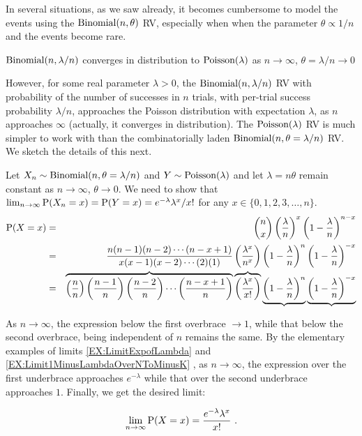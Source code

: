 \begin{example}\label{EgBinomialConvergesInDistToPoisson}
In several situations, as we saw already, it becomes cumbersome to model the events using the $\binomial(n,\theta)$ RV, especially when when the parameter $\theta \propto 1/n$ and the events become rare.  

\begin{center}
\begin{frame}
{$\binomial(n,\lambda/n)$ converges in distribution to $\poisson(\lambda)$ as $n \to \infty$, $\theta=\lambda/n \to 0$}
\end{frame}
\end{center}

However, for some real parameter $\lambda>0$, the $\binomial(n,\lambda/n)$ RV with probability of the number of successes in $n$ trials, with per-trial success probability $\lambda/n$, approaches the Poisson distribution with expectation $\lambda$, as $n$ approaches $\infty$ (actually, it converges in distribution).  
The $\poisson(\lambda)$ RV is much simpler to work with than the combinatorially laden $\binomial(n,\theta=\lambda/n)$ RV.  We sketch the details of this next.

Let $X_n \sim \binomial(n,\theta=\lambda/n)$ and $Y \sim \poisson(\lambda)$ and let $\lambda=n\theta$ remain constant as  $n \to \infty$, $\theta \to 0$.  
We need to show that $\lim_{n \to \infty} \P(X_n=x) = \P(Y=x) = e^{-\lambda}\lambda^x/x!$ for any $x \in \{0,1,2,3,\ldots,n\}$. 
\begin{eqnarray}
\P(X=x)
&=&
\binom{n}{x} \left( \frac{\lambda}{n} \right)^x \left( 1- \frac{\lambda}{n} \right)^{n-x} \notag \\
&=& \frac{n(n-1)(n-2)\cdots(n-x+1)}{x(x-1)(x-2)\cdots (2)(1)}
\left( \frac{\lambda^x}{n^x} \right)
\left( 1- \frac{\lambda}{n} \right)^n
\left( 1- \frac{\lambda}{n} \right)^{-x} \notag \\
&=&
\overbrace{\left( \frac{n}{n} \right) \left( \frac{n-1}{n} \right) \left( \frac{n-2}{n} \right) \cdots \left( \frac{n-x+1}{n} \right)}
\overbrace{\left( \frac{\lambda^x}{x!} \right)}
\underbrace{\left( 1- \frac{\lambda}{n} \right)^n}
\underbrace{\left( 1- \frac{\lambda}{n} \right)^{-x}}  \notag \\
\end{eqnarray}

As $n \to \infty$, the expression below the first overbrace $\to 1$, while that below the second overbrace, being independent of $n$ remains the same.  By the elementary examples of limits
\ref*{EX:LimitExpofLambda} and \ref*{EX:Limit1MinusLambdaOverNToMinusK}%
, as $n \to \infty$, the expression over the first underbrace approaches $e^{-\lambda}$ while that over the second underbrace approaches $1$.  Finally, we get the desired limit:

\[
\lim_{n \to \infty} \P(X=x)
= \frac{ e^{-\lambda} \lambda^x}{x!}  \ .
\]
\end{example}

